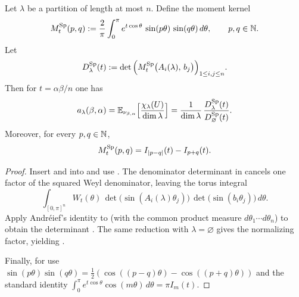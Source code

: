 \begin{proposition}
\label{prop:Sp_det_formula}
Let $\lambda$ be a partition of length at most $n$.
Define the moment kernel
\begin{equation}
\label{eq:Sp_moment_kernel_def}
M_t^{\mathrm{Sp}}(p,q)
:=\frac{2}{\pi}\int_0^{\pi} e^{t\cos\theta}\,\sin(p\theta)\,\sin(q\theta)\,d\theta,
\qquad p,q\in\mathbb N.
\end{equation}
Let
\begin{equation}
\label{eq:Sp_Dlambda_def}
D_{\lambda}^{\mathrm{Sp}}(t)
:=\det\Big(M_t^{\mathrm{Sp}}\big(A_i(\lambda),\,b_j\big)\Big)_{1\le i,j\le n}.
\end{equation}
Then for $t=\alpha\beta/n$ one has
\begin{equation}
\label{eq:Sp_coeff_det_ratio}
 a_{\lambda}(\beta,\alpha)
=\mathbb E_{\nu_{\beta,\alpha}}\Big[\frac{\chi_{\lambda}(U)}{\dim\lambda}\Big]
=\frac{1}{\dim\lambda}\,\frac{D_{\lambda}^{\mathrm{Sp}}(t)}{D_{\varnothing}^{\mathrm{Sp}}(t)}.
\end{equation}
Moreover, for every $p,q\in\mathbb N$,
\begin{equation}
\label{eq:Sp_kernel_bessel}
M_t^{\mathrm{Sp}}(p,q)=I_{|p-q|}(t)-I_{p+q}(t).
\end{equation}
\end{proposition}

\begin{proof}
Insert  and  into  and use
.
The denominator determinant in  cancels one factor of the squared Weyl denominator,
leaving the torus integral
\begin{equation}
\label{eq:Sp_andreief_integral}
\int_{[0,\pi]^n} W_t(\theta)\,\det\big(\sin(A_i(\lambda)\theta_j)\big)\,\det\big(\sin(b_i\theta_j)\big)\,d\theta.
\end{equation}
Apply Andr\'eief's identity to  (with the common product measure $d\theta_1\cdots d\theta_n$)
 to obtain the determinant .
The same reduction with $\lambda=\varnothing$ gives the normalizing factor, yielding .

Finally, for  use
$\sin(p\theta)\sin(q\theta)=\tfrac12(\cos((p-q)\theta)-\cos((p+q)\theta))$ and the standard identity
$\int_0^{\pi} e^{t\cos\theta}\cos(m\theta)\,d\theta=\pi I_m(t)$.
\end{proof}


